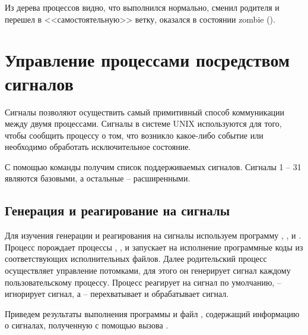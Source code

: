 



Из дерева процессов видно, что  выполнился нормально,  сменил родителя и перешел в <<самостоятельную>> ветку,  оказался в состоянии zombie ().

\section{Управление процессами посредством сигналов}

Сигналы позволяют осуществить самый примитивный способ
коммуникации между двумя процессами. Сигналы в системе UNIX  используются для того, чтобы сообщить процессу о том, что возникло какое-либо событие или необходимо обработать
исключительное состояние. 

С помощью команды  получим список поддерживаемых сигналов. Сигналы 1 -- 31 являются базовыми, а остальные -- расширенными.



\subsection{Генерация и реагирование на сигналы}

Для изучения генерации и реагирования на сигналы используем программу , ,  и . Процесс  порождает процессы , ,  и запускает на исполнение программные коды из соответствующих исполнительных файлов. Далее родительский процесс осуществляет управление потомками, для этого он генерирует сигнал каждому пользовательскому процессу. Процесс  реагирует на сигнал по умолчанию,  -- игнорирует сигнал, а  -- перехватывает и обрабатывает сигнал.









Приведем результаты выполнения программы  и файл , содержащий информацию о сигналах, полученную с помощью вызова .

